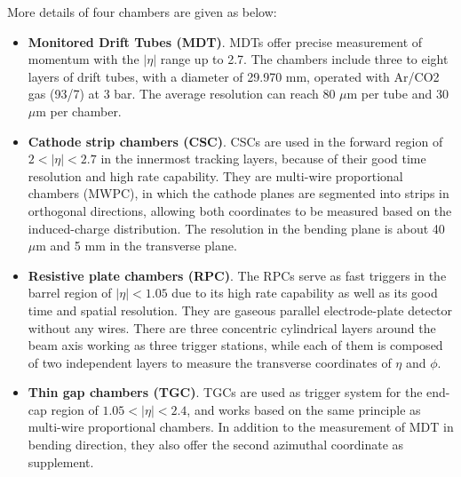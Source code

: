 More details of four chambers are given as below:
\begin{itemize}
	\item \textbf{Monitored Drift Tubes (MDT)}. MDTs offer precise measurement of momentum with the $|\eta|$ range up to 2.7.
        The chambers include three to eight layers of drift tubes, with a diameter of 29.970 mm, operated with Ar/CO2 gas (93/7) at 3 bar. The average resolution can reach 80 $\mu$m per tube and 30 $\mu$m per chamber.
	\item \textbf{Cathode strip chambers (CSC)}. CSCs are used in the forward region of $2 < |\eta| < 2.7$ in the innermost tracking layers, because of their good time resolution and high rate capability. 
        They are multi-wire proportional chambers (MWPC), in which the cathode planes are segmented into strips in orthogonal directions, allowing both coordinates to be measured based on the induced-charge distribution. 
        The resolution in the bending plane is about 40 $\mu$m and 5 mm in the transverse plane.
	\item \textbf{Resistive plate chambers (RPC)}. The RPCs serve as fast triggers in the barrel region of $|\eta| < 1.05$ due to its high rate capability as well as its good time and spatial resolution. 
        They are gaseous parallel electrode-plate detector without any wires. 
        There are three concentric cylindrical layers around the beam axis working as three trigger stations, while each of them is composed of two independent layers to measure the transverse coordinates of $\eta$ and $\phi$.
	\item \textbf{Thin gap chambers (TGC)}. TGCs are used as trigger system for the end-cap region of $1.05 < |\eta| < 2.4$, and works based on the same principle as multi-wire proportional chambers. 
        In addition to the measurement of MDT in bending direction, they also offer the second azimuthal coordinate as supplement.
\end{itemize}
